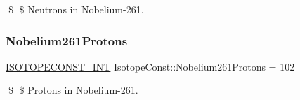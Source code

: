 \$ \$ Neutrons in Nobelium-\/261. \mbox{\label{group___isotope_const-_nobelium-_no261_ga081d793b7e096626e6d0064798bb03b8}} 
\subsubsection{\texorpdfstring{Nobelium261\+Protons}{Nobelium261Protons}}
{\footnotesize\ttfamily \mbox{\hyperlink{group___isotope_const-_macros_ga5f18360b3e99483a35c32d789e62621c}{I\+S\+O\+T\+O\+P\+E\+C\+O\+N\+S\+T\+\_\+\+I\+NT}} Isotope\+Const\+::\+Nobelium261\+Protons = 102}

\$ \$ Protons in Nobelium-\/261. 